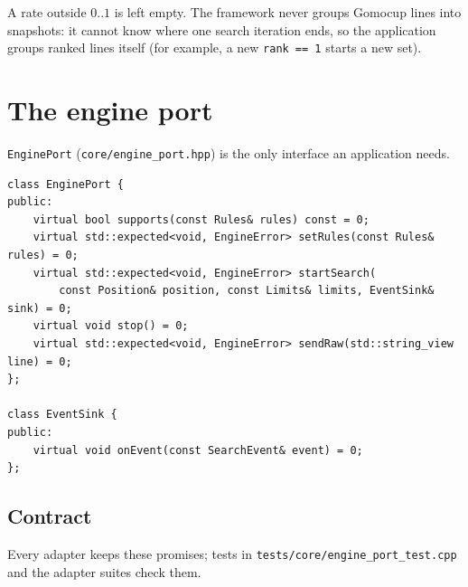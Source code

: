 \documentclass[11pt,a4paper]{article}
\newcommand{\code}[1]{\texttt{#1}}
\newcommand{\file}[1]{\texttt{#1}}
\begin{document}
\noindent A rate outside $0..1$ is left empty. The framework never groups Gomocup lines into
snapshots: it cannot know where one search iteration ends, so the application groups ranked
lines itself (for example, a new \code{rank == 1} starts a new set).

\section{The engine port}\label{sec:port}

\code{EnginePort} (\file{core/engine\_port.hpp}) is the only interface an application needs.

\begin{lstlisting}
class EnginePort {
public:
    virtual bool supports(const Rules& rules) const = 0;
    virtual std::expected<void, EngineError> setRules(const Rules& rules) = 0;
    virtual std::expected<void, EngineError> startSearch(
        const Position& position, const Limits& limits, EventSink& sink) = 0;
    virtual void stop() = 0;
    virtual std::expected<void, EngineError> sendRaw(std::string_view line) = 0;
};

class EventSink {
public:
    virtual void onEvent(const SearchEvent& event) = 0;
};
\end{lstlisting}

\subsection{Contract}

Every adapter keeps these promises; tests in \file{tests/core/engine\_port\_test.cpp} and the
adapter suites check them.
\end{document}
